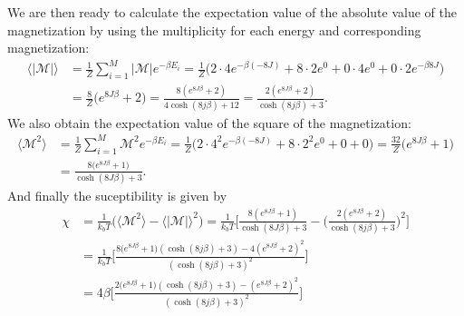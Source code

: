 \documentclass[11pt,a4wide]{article}
\begin{document}
We are then ready to calculate the expectation value of the absolute value of the magnetization by using the multiplicity for each energy and corresponding magnetization:
\begin{align}
\langle |\mathcal{M}| \rangle &= \frac{1}{Z}\sum_{i=1}^M |\mathcal{M}|  e^{-\beta E_i} = \frac{1}{Z} \bigg( 2\cdot 4e^{-\beta(-8J)} + 8\cdot 2e^0 + 0\cdot4e^0 + 0\cdot 2e^{-\beta 8J} \bigg)\nonumber \\
&= \frac{8}{Z}\big(e^{8J\beta} + 2\big) = \frac{8(e^{8J\beta} + 2)}{4\cosh(8j\beta) + 12} = \frac{2(e^{8J\beta}+ 2)}{\cosh(8j\beta) + 3}.
\label{eq: exp absM} 
\end{align}
We also obtain the expectation value of the square of the magnetization:
\begin{align*}
\langle \mathcal{M}^2 \rangle &= \frac{1}{Z}\sum_{i=1}^M \mathcal{M}^2 e^{-\beta E_i} = \frac{1}{Z}\big( 2\cdot 4^2 e^{-\beta (-8J)} + 8\cdot 2^2e^0 + 0 + 0 \big) = \frac{32}{Z}\big( e^{8J\beta} + 1 \big) \\
&= \frac{8\big(e^{8J\beta} + 1\big)}{\cosh(8J\beta) + 3}.
\end{align*}
And finally the suceptibility is given by
\begin{align*}
\chi &= \frac{1}{k_bT}\big( \langle \mathcal{M}^2 \rangle - \langle |\mathcal{M}| \rangle^2 \big) = \frac{1}{k_bT}\bigg[ \frac{8(e^{8J\beta} + 1)}{\cosh(8J\beta) + 3} - \bigg( \frac{2(e^{8J\beta}+ 2)}{\cosh(8j\beta) + 3} \bigg)^2 \bigg] \\
&= \frac{1}{k_bT}\bigg[ \frac{8(e^{8J\beta} + 1\big)(\cosh(8j\beta) + 3) - 4(e^{8J\beta}+ 2)^2}{(\cosh(8j\beta) + 3)^2} \bigg] \\
&= 4\beta \bigg[ \frac{2(e^{8J\beta} + 1\big)(\cosh(8j\beta) + 3) - (e^{8J\beta}+ 2)^2}{(\cosh(8j\beta) + 3)^2} \bigg] 
\end{align*}
\end{document}
